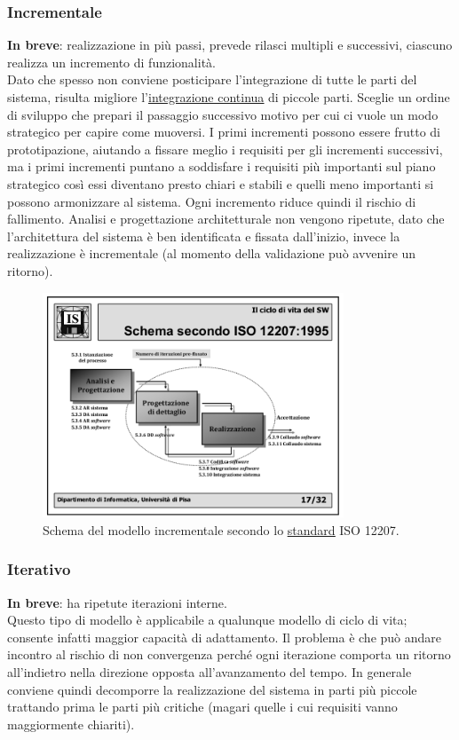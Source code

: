 			\subsubsection{Incrementale}  \label{mincrementale}
			\textbf{In breve}: realizzazione in più passi, prevede rilasci multipli e successivi, ciascuno realizza un incremento di funzionalità. \\
			Dato che spesso non conviene posticipare l'integrazione di tutte le parti del sistema, risulta migliore l'\underline{\hyperref[integrazione]{integrazione continua}} di piccole parti. Sceglie un ordine di sviluppo che prepari il passaggio successivo motivo per cui ci vuole un modo strategico per capire come muoversi. I primi incrementi possono essere frutto di prototipazione,
			aiutando a fissare meglio i requisiti per gli incrementi successivi, ma i primi incrementi puntano a soddisfare i requisiti più importanti sul piano strategico così essi diventano presto chiari e stabili e quelli meno importanti si possono armonizzare al sistema. Ogni incremento riduce quindi il rischio di fallimento. Analisi e progettazione architetturale non vengono ripetute, dato che l'architettura del sistema è ben identificata e fissata dall'inizio, invece la realizzazione è incrementale (al momento della validazione può avvenire un ritorno).

			\begin{figure}[H]
				\centering
				\includegraphics[width=0.8\textwidth]{img/incrementale}
				\caption{Schema del modello incrementale secondo lo \underline{\hyperref[standard]{standard}} ISO 12207.}
			\end{figure}

			\subsubsection{Iterativo}  \label{miterativo}
			\textbf{In breve}: ha ripetute iterazioni interne. \\
			Questo tipo di modello è applicabile a qualunque modello di ciclo di vita; consente infatti maggior capacità di adattamento. Il problema è che può andare incontro al rischio di non convergenza perché ogni iterazione comporta un ritorno all'indietro nella direzione opposta all'avanzamento del tempo. In generale conviene quindi decomporre la realizzazione del sistema in parti più piccole trattando prima le parti più critiche (magari quelle i cui requisiti vanno maggiormente chiariti).

